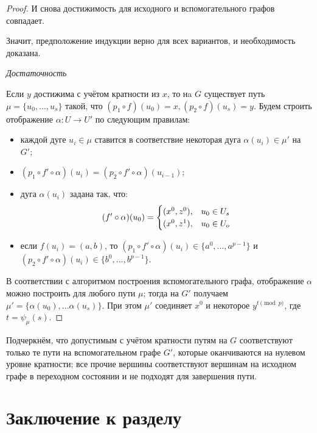 \begin{proof}
	И снова достижимость для исходного и вспомогательного графов совпадает. 
	
	Значит, предположение индукции верно для всех вариантов, и необходимость доказана.
	
	\textit {Достаточность}
	
	Если $y$ достижима с учётом кратности из $x$, то нa $G$ существует путь $\mu = \{u_0, ... , u_s\}$ такой, что $(p_1 \circ f)(u_0) = x, (p_2 \circ f)(u_s) = y$. Будем строить отображение $\alpha:U\to U'$ по следующим правилам:
	
	\begin{itemize}
		\item каждой дуге $u_i \in \mu$ ставится в соответствие некоторая дуга $\alpha(u_i) \in \mu'$ на $G'$;
		\item $(p_1 \circ f' \circ \alpha)(u_i) = (p_2 \circ f' \circ \alpha)(u_{i-1})$;
		\item дуга $\alpha(u_i)$ задана так, что: 
		\begin{equation*}
		(f' \circ \alpha)(u_0) =
		\begin{cases}
		(x^0, z^0), &\text{$ u_0 \in U_s$}\\
		(x^0, z^1), &\text{$ u_0 \in U_o$}
		\end{cases}
		\end{equation*} 
		
		\newpage
		
		\item если $f(u_i) = (a, b)$, то $(p_1 \circ f' \circ \alpha)(u_i) \in \{a^0, ... , a^{p-1}\}$ и $(p_2 \circ f' \circ \alpha)(u_i) \in \{b^0, ... , b^{p-1}\}$.
	\end{itemize}
	
	В соответствии с алгоритмом построения вспомогательного графа, отображение $\alpha$ можно построить для любого пути $\mu$; тогда на $G'$ получаем $\mu' = \{\alpha(u_0), ...  \alpha(u_s)\}$. При этом $\mu'$ соединяет $x^0$ и некоторое $y^{t \pmod p}$, где $t = \psi_\mu(s)$.
\end{proof}

Подчеркнём, что допустимым с учётом кратности путям на $G$ соответствуют только те пути на вспомогательном графе $G'$, которые оканчиваются на нулевом уровне кратности; все прочие вершины соответствуют вершинам на исходном графе в переходном состоянии и не подходят для завершения пути.  

\section{Заключение к разделу}


